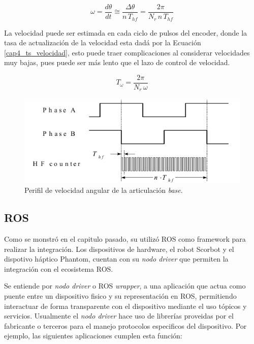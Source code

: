 \begin{equation}\label{cap4_estimacion_velocidad}
\omega = \frac{d\theta}{dt} \cong \frac{\Delta\theta}{n\,T_{hf}} =  \frac{2\pi}{N_r\,n\,T_{hf}}
\end{equation}

La velocidad puede ser estimada en cada ciclo de pulsos del encoder, donde la tasa de actualización de la velocidad esta dadá por la Ecuación \ref{cap4_ts_velocidad}, esto puede traer complicaciones al considerar velocidades muy bajas, pues puede ser más lento que el lazo de control de velocidad.

\begin{equation}\label{cap4_ts_velocidad}
T_\omega = \frac{2\pi}{N_r\,\omega}
\end{equation}


\begin{figure}[ht]
  \centering
  \includegraphics[scale=0.6]{img/cap4/diagrama_velocidad_encoder}
  \caption{Perifil de velocidad angular de la articulación \textit{base}.}
  \label{cap4_diagrama_velocidad_encoder}
\end{figure}





\subsection{ROS}

Como se monstró en el capitulo pasado, su utilizó ROS como framework para realizar la integración. Los dispositivos de hardware, el robot Scorbot y el dispotivo háptico Phantom, cuentan con su \textit{nodo driver} que permiten la integración con el ecosistema ROS.

Se entiende por \textit{nodo driver} o ROS \textit{wrapper}, a una aplicación que actua como puente entre un dispositivo fisico y su representación en ROS, permitiendo interactuar de forma transparente con el dispositivo mediante el uso tópicos y servicios. Usualmente el \textit{nodo driver} hace uso de librerías proveidas por el fabricante o terceros para el manejo protocolos especificos del dispositivo. Por ejemplo, las siguientes aplicaciones cumplen esta función:

